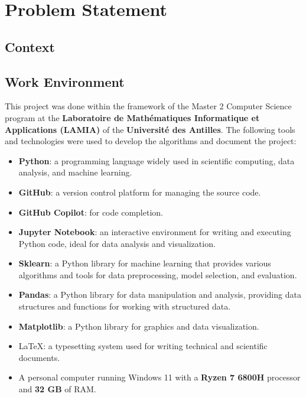 \chapter{Problem Statement}
\label{chap:problem_statement}

\section{Context}
\label{sec:context}



\section{Work Environment}
\label{sec:work_environment}

This project was done within the framework of the Master 2 Computer Science program at the
\textbf{Laboratoire de Mathématiques Informatique et Applications (LAMIA)} of the \textbf{Université des Antilles}.
The following tools and technologies were used to develop the algorithms and document the project:

\begin{itemize}
	\item \textbf{Python}: a programming language widely used in scientific computing, data analysis, and machine learning.
	\item \textbf{GitHub}: a version control platform for managing the source code.
	\item \textbf{GitHub Copilot}: for code completion.
	\item \textbf{Jupyter Notebook}: an interactive environment for writing and executing Python code, ideal for data analysis and
	      visualization.
	\item \textbf{Sklearn}: a Python library for machine learning that provides various algorithms and tools for data preprocessing,
	      model selection, and evaluation.
	\item \textbf{Pandas}: a Python library for data manipulation and analysis, providing data structures and functions for working with
	      structured data.
	\item \textbf{Matplotlib}: a Python library for graphics and data visualization.
	\item \LaTeX : a typesetting system used for writing technical and scientific documents.
	\item A personal computer running Windows 11 with a \textbf{Ryzen 7 6800H} processor and \textbf{32 GB} of RAM.
\end{itemize}

